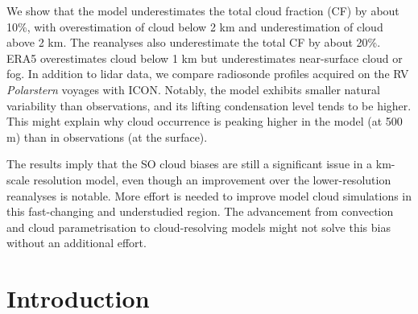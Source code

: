 \documentclass[12pt,a4paper]{article}
\begin{document}
We show that the model underestimates the total cloud fraction (CF) by about 10\%,
with overestimation of cloud below 2 km and underestimation of cloud above 2
km. The reanalyses also underestimate the total CF by about 20\%.
ERA5 overestimates cloud below 1 km but underestimates near-surface cloud or
fog. In addition to lidar data, we compare radiosonde profiles acquired on the
RV \textit{Polarstern} voyages with ICON. Notably, the model exhibits smaller
natural variability than observations, and its lifting condensation level tends
to be higher. This might explain why cloud occurrence is peaking higher in the
model (at 500 m) than in observations (at the surface).

The results imply that the SO cloud biases are still a significant issue in a
km-scale resolution model, even though an improvement over the lower-resolution
reanalyses is notable. More effort is needed to improve model cloud simulations
in this fast-changing and understudied region. The advancement from convection
and cloud parametrisation to cloud-resolving models might not solve this bias
without an additional effort.

\section{Introduction}
\end{document}
